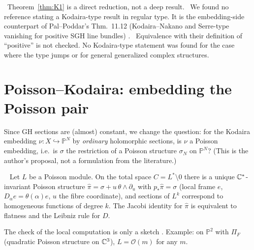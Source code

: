 \begin{rem}[Position]
\tP\ Theorem~\ref{thm:K1} is a direct reduction, not a deep result. \tC\ We found no reference stating a Kodaira-type result in regular type. It is the embedding-side counterpart of Pal--Poddar's Thm.~11.12 (Kodaira--Nakano and Serre-type vanishing for positive SGH line bundles) \tC. \tQ\ Equivalence with their definition of ``positive'' is not checked. No Kodaira-type statement was found for the case where the type jumps or for general generalized complex structures.
\end{rem}

\section{Poisson--Kodaira: embedding the Poisson pair}\label{sec:PK}
Since GH sections are (almost) constant, we change the question: for the Kodaira embedding $\nu:X\hookrightarrow\mathbb P^N$ by \emph{ordinary} holomorphic sections, is $\nu$ a Poisson embedding, i.e.\ is $\sigma$ the restriction of a Poisson structure $\sigma_N$ on $\mathbb P^N$? (This is the author's proposal, not a formulation from the literature.)

\begin{lem}\tP\ \tQ\label{lem:lift}
Let $L$ be a Poisson module. On the total space $C=L^*\setminus0$ there is a unique $\mathbb C^*$-invariant Poisson structure $\hat\pi=\sigma+u\,\theta\wedge\partial_u$ with $p_*\hat\pi=\sigma$ (local frame $e$, $D_\alpha e=\theta(\alpha)e$, $u$ the fibre coordinate), and sections of $L^k$ correspond to homogeneous functions of degree $k$. The Jacobi identity for $\hat\pi$ is equivalent to flatness and the Leibniz rule for $D$.
\end{lem}
\noindent The check of the local computation is only a sketch \tQ. Example: on $\mathbb P^2$ with $\Pi_F$ (quadratic Poisson structure on $\mathbb C^3$), $L=\mathcal O(m)$ for any $m$.

